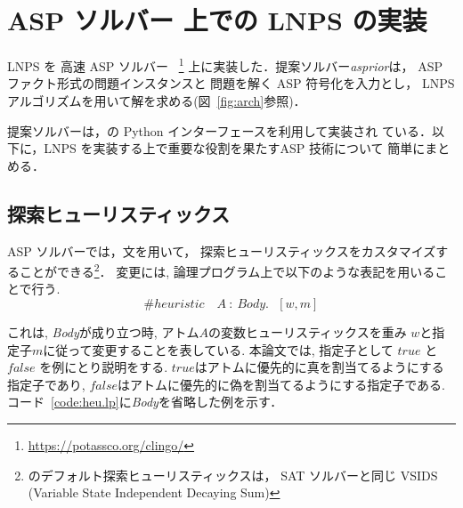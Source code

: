 \chapter{ASP ソルバー 上での LNPS の実装}



LNPS を 高速 ASP ソルバー
{\clingo}~\footnote{\url{https://potassco.org/clingo/}}
上に実装した．提案ソルバー\textit{asprior}は，
ASP ファクト形式の問題インスタンスと
問題を解く ASP 符号化を入力とし，
LNPS アルゴリズムを用いて解を求める(図~\ref{fig:arch}参照)．

提案ソルバーは，{\clingo}の Python インターフェースを利用して実装され
ている．以下に，LNPS を実装する上で重要な役割を果たすASP 技術について
簡単にまとめる．

\section{探索ヒューリスティックス}






ASP ソルバー{\clingo}では，文を用いて，
探索ヒューリスティックスをカスタマイズすることができる\footnote{%
{\clingo}のデフォルト探索ヒューリスティックスは，
SAT ソルバーと同じ VSIDS (Variable State Independent Decaying Sum)}．
変更には, 論理プログラム上で以下のような表記を用いることで行う. 
\begin{displaymath}
\#heuristic \quad A~ : ~Body. ~~~[w,m]
\end{displaymath}

これは, \textit{Body}が成り立つ時, アトム$A$の変数ヒューリスティックスを重み
$w$と指定子$m$に従って変更することを表している. 
本論文では, 指定子として $true$ と $false$ を例にとり説明をする. 
$true$はアトムに優先的に真を割当てるようにする指定子であり, 
$false$はアトムに優先的に偽を割当てるようにする指定子である. 
コード~\ref{code:heu.lp}に\textit{Body}を省略した例を示す．

